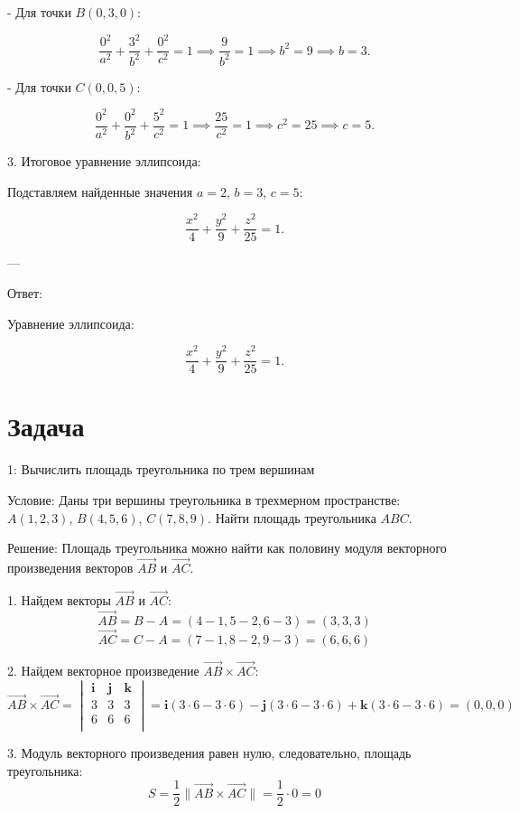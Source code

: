 \documentclass[a4paper,14pt]{extreport} %
\begin{document}
   - Для точки \( B(0, 3, 0) \):

     \[
     \frac{0^2}{a^2} + \frac{3^2}{b^2} + \frac{0^2}{c^2} = 1 \implies \frac{9}{b^2} = 1 \implies b^2 = 9 \implies b = 3.
     \]

   - Для точки \( C(0, 0, 5) \):

     \[
     \frac{0^2}{a^2} + \frac{0^2}{b^2} + \frac{5^2}{c^2} = 1 \implies \frac{25}{c^2} = 1 \implies c^2 = 25 \implies c = 5.
     \]

3.  Итоговое уравнение эллипсоида: 

   Подставляем найденные значения \( a = 2 \), \( b = 3 \), \( c = 5 \):

   \[
   \frac{x^2}{4} + \frac{y^2}{9} + \frac{z^2}{25} = 1.
   \]

---

 Ответ: 

Уравнение эллипсоида:

\[
\frac{x^2}{4} + \frac{y^2}{9} + \frac{z^2}{25} = 1.
\]
    \section*{Задача}1: Вычислить площадь треугольника по трем вершинам

 Условие:   
Даны три вершины треугольника в трехмерном пространстве:  
\( A(1, 2, 3) \), \( B(4, 5, 6) \), \( C(7, 8, 9) \).  
Найти площадь треугольника \( ABC \).

 Решение:   
Площадь треугольника можно найти как половину модуля векторного произведения векторов \( \vec{AB} \) и \( \vec{AC} \).

1. Найдем векторы \( \vec{AB} \) и \( \vec{AC} \):
   \[
   \vec{AB} = B - A = (4-1, 5-2, 6-3) = (3, 3, 3)
   \]
   \[
   \vec{AC} = C - A = (7-1, 8-2, 9-3) = (6, 6, 6)
   \]

2. Найдем векторное произведение \( \vec{AB} \times \vec{AC} \):
   \[
   \vec{AB} \times \vec{AC} = 
   \begin{vmatrix}
   \mathbf{i} & \mathbf{j} & \mathbf{k} \\
   3 & 3 & 3 \\
   6 & 6 & 6 \\
   \end{vmatrix}
   = \mathbf{i}(3 \cdot 6 - 3 \cdot 6) - \mathbf{j}(3 \cdot 6 - 3 \cdot 6) + \mathbf{k}(3 \cdot 6 - 3 \cdot 6)
   = (0, 0, 0)
   \]

3. Модуль векторного произведения равен нулю, следовательно, площадь треугольника:
   \[
   S = \frac{1}{2} \| \vec{AB} \times \vec{AC} \| = \frac{1}{2} \cdot 0 = 0
   \]
\end{document}
